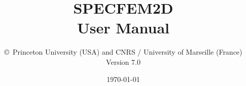 \documentclass[oneside,english,onecolumn,letterpaper]{book}
\begin{document}
\thispagestyle{empty}
\vspace*{\fill}
\begingroup
\centering
{}
\endgroup
\vspace*{\fill}
\restoregeometry

\title{\textbf{SPECFEM2D}\\
\textbf{User Manual}}

\author{\copyright\ Princeton University (USA) and CNRS / University of Marseille (France)\\
Version 7.0
}

\date{\today}

\maketitle
\end{document}
